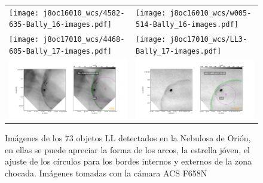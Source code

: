 \documentclass{article}
\begin{document}
\begin{figure}[htp]
\centering
\begin{tabular}{l l}
     \texttt{[image: j8oc16010\_wcs/4582-635-Bally\_16-images.pdf]}
    &\texttt{[image: j8oc16010\_wcs/w005-514-Bally\_16-images.pdf]}\\
    \texttt{[image: j8oc17010\_wcs/4468-605-Bally\_17-images.pdf]}
    &\texttt{[image: j8oc17010\_wcs/LL3-Bally\_17-images.pdf]}\\
    \includegraphics[width=0.5\linewidth]{j8oc18010_wcs/LL2-Bally_18-images.pdf}
    &\includegraphics[width=0.5\linewidth]{j8oc24010_wcs/LL4-Bally_24-images.pdf}\\
   
\end{tabular}
  \caption{Imágenes de los 73 objetos LL detectados en la Nebulosa de Orión, en ellas se puede apreciar la forma de los arcos, la estrella jóven, el ajuste de los círculos para los bordes internos y externos de la zona chocada. Imágenes tomadas con la cámara ACS F658N}
  \label{fig:images}
  
\end{figure}


\end{document}
